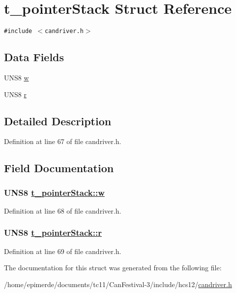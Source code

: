 \hypertarget{structt__pointerStack}{
\section{t\_\-pointer\-Stack Struct Reference}
\label{structt__pointerStack}
}
{\tt \#include $<$candriver.h$>$}

\subsection*{Data Fields}
\begin{CompactItemize}
\item 
UNS8 \hyperlink{structt__pointerStack_2932da8af07722bab7bb70042bca9e55}{w}
\item 
UNS8 \hyperlink{structt__pointerStack_828854582cfd2d911935d50deec2f89e}{r}
\end{CompactItemize}


\subsection{Detailed Description}




Definition at line 67 of file candriver.h.

\subsection{Field Documentation}
\hypertarget{structt__pointerStack_2932da8af07722bab7bb70042bca9e55}{
\subsubsection[w]{\setlength{\rightskip}{0pt plus 5cm}UNS8 \hyperlink{structt__pointerStack_2932da8af07722bab7bb70042bca9e55}{t\_\-pointer\-Stack::w}}}
\label{structt__pointerStack_2932da8af07722bab7bb70042bca9e55}




Definition at line 68 of file candriver.h.\hypertarget{structt__pointerStack_828854582cfd2d911935d50deec2f89e}{
\subsubsection[r]{\setlength{\rightskip}{0pt plus 5cm}UNS8 \hyperlink{structt__pointerStack_828854582cfd2d911935d50deec2f89e}{t\_\-pointer\-Stack::r}}}
\label{structt__pointerStack_828854582cfd2d911935d50deec2f89e}




Definition at line 69 of file candriver.h.

The documentation for this struct was generated from the following file:\begin{CompactItemize}
\item 
/home/epimerde/documents/tc11/Can\-Festival-3/include/hcs12/\hyperlink{candriver_8h}{candriver.h}\end{CompactItemize}
